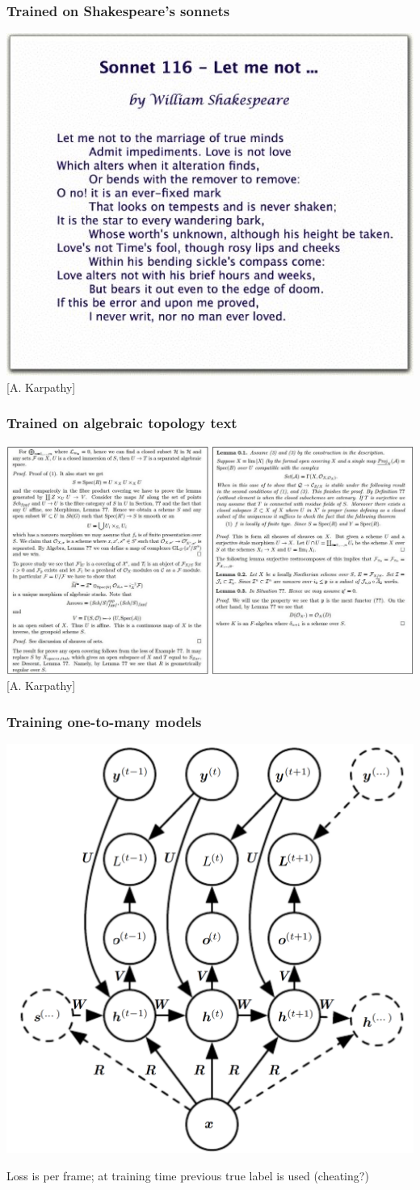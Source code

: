 \documentclass[xcolor=dvipsnames]{beamer}
\begin{document}
\begin{frame}
  \frametitle{Trained on Shakespeare's sonnets}
  \includegraphics[width=.7\textwidth]{ak-shakespear}\\
{[A. Karpathy]}
\end{frame}

\begin{frame}
  \frametitle{Trained on algebraic topology text}
    \includegraphics[width=.9\textwidth]{ak-topology}\\
{[A. Karpathy]}
\end{frame}


\begin{frame}
  \frametitle{Training one-to-many models}
  \includegraphics[width=.6\textwidth]{gcb-x2seq-varlen}\raisebox{1em}{[Goodfellow
  et al.]}
\bi
\item Loss is per frame; at training time previous true label is used (cheating?)
\ei
\end{frame}
\end{document}
